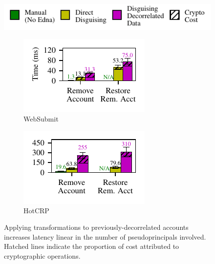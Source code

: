 \begin{figure}[t]
    \centering
    \includegraphics{figs/composition_legend}
    \begin{subfigure}[b]{0.49\columnwidth}
        \includegraphics{figs/composition_stats_websubmit}
        \caption{WebSubmit}
        \label{f:comp-websubmit}
      \end{subfigure}
      \begin{subfigure}[b]{0.49\columnwidth}
        \includegraphics{figs/composition_stats_hotcrp}
          \caption{HotCRP}
        \label{f:comp-hotcrp}
      \end{subfigure}
    \caption{Applying \xxing transformations to previously-decorrelated accounts
      increases latency linear in the number of pseudoprincipals involved.
      Hatched lines indicate the proportion of cost attributed to
      cryptographic operations.}
    \label{f:composition}
\end{figure}

